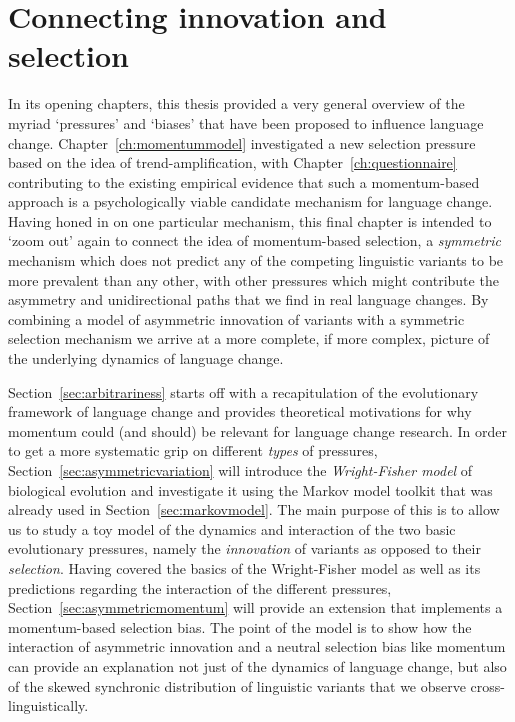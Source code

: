 \section{Connecting innovation and selection}

In its opening chapters, this thesis provided a very general overview of the myriad `pressures' and `biases' that have been proposed to influence language change. Chapter~\ref{ch:momentummodel} investigated a new selection pressure based on the idea of trend-amplification, with Chapter~\ref{ch:questionnaire} contributing to the existing empirical evidence that such a momentum-based approach is a psychologically viable candidate mechanism for language change.
Having honed in on one particular mechanism, this final chapter is intended to `zoom out' again to connect the idea of momentum-based selection, a \emph{symmetric} mechanism which does not predict any of the competing linguistic variants to be more prevalent than any other, with other pressures which might contribute the asymmetry and unidirectional paths that we find in real language changes. By combining a model of asymmetric innovation of variants with a symmetric selection mechanism we arrive at a more complete, if more complex, picture of the underlying dynamics of language change.

Section~\ref{sec:arbitrariness} starts off with a recapitulation of the evolutionary framework of language change and provides theoretical motivations for why momentum could (and should) be relevant for language change research.
In order to get a more systematic grip on different \emph{types} of pressures, Section~\ref{sec:asymmetricvariation} will introduce the \emph{Wright-Fisher model} of biological evolution and investigate it using the Markov model toolkit that was already used in Section~\ref{sec:markovmodel}. The main purpose of this is to allow us to study a toy model of the dynamics and interaction of the two basic evolutionary pressures, namely the \emph{innovation} of variants as opposed to their \emph{selection}. Having covered the basics of the Wright-Fisher model as well as its predictions regarding the interaction of the different pressures, Section~\ref{sec:asymmetricmomentum} will provide an extension that implements a momentum-based selection bias. The point of the model is to show how the interaction of asymmetric innovation and a neutral selection bias like momentum can provide an explanation not just of the dynamics of language change, but also of the skewed synchronic distribution of linguistic variants that we observe cross-linguistically.

